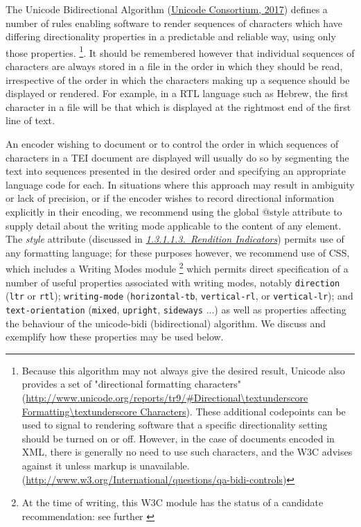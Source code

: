 The Unicode Bidirectional Algorithm (\hyperref[WDBIDI]{Unicode Consortium, 2017}) defines a number of rules enabling software to render sequences of characters which have differing directionality properties in a predictable and reliable way, using only those properties. \footnote{Because this algorithm may not always give the desired result, Unicode also provides a set of "directional formatting characters" (\url{http://www.unicode.org/reports/tr9/\#Directional\textunderscore Formatting\textunderscore Characters}). These additional codepoints can be used to signal to rendering software that a specific directionality setting should be turned on or off. However, in the case of documents encoded in XML, there is generally no need to use such characters, and the W3C advises against it unless markup is unavailable. (\url{http://www.w3.org/International/questions/qa-bidi-controls})}. It should be remembered however that individual sequences of characters are always stored in a file in the order in which they should be read, irrespective of the order in which the characters making up a sequence should be displayed or rendered. For example, in a RTL language such as Hebrew, the first character in a file will be that which is displayed at the rightmost end of the first line of text.\par
An encoder wishing to document or to control the order in which sequences of characters in a TEI document are displayed will usually do so by segmenting the text into sequences presented in the desired order and specifying an appropriate language code for each. In situations where this approach may result in ambiguity or lack of precision, or if the encoder wishes to record directional information explicitly in their encoding, we recommend using the global @style attribute to supply detail about the writing mode applicable to the content of any element. The {\itshape style} attribute (discussed in \textit{\hyperref[STGAre]{1.3.1.1.3.\ Rendition Indicators}}) permits use of any formatting language; for these purposes however, we recommend use of CSS, which includes a Writing Modes module \footnote{At the time of writing, this W3C module has the status of a candidate recommendation: see further \cite{CSSWM} } which permits direct specification of a number of useful properties associated with writing modes, notably \texttt{direction} (\texttt{ltr} or \texttt{rtl}); \texttt{writing-mode} (\texttt{horizontal-tb}, \texttt{vertical-rl}, or \texttt{vertical-lr}); and \texttt{text-orientation} (\texttt{mixed}, \texttt{upright}, \texttt{sideways} ...)   as well as properties affecting the behaviour of the unicode-bidi (bidirectional) algorithm. We discuss and exemplify how these properties may be used below.\par
